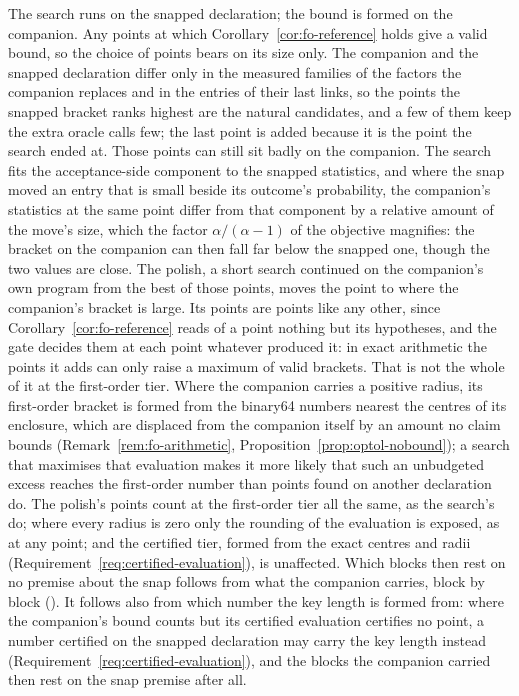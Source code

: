 The search runs on the snapped declaration; the bound is formed on the
companion. Any points at which Corollary~\ref{cor:fo-reference} holds give a
valid bound, so the choice of points bears on its size only. The companion
and the snapped declaration differ only in the measured families of the
factors the companion replaces and in the entries of their last links, so the
points the snapped bracket ranks highest are the natural candidates, and a
few of them keep the extra oracle calls few; the last point is added because
it is the point the search ended at. Those points can still sit badly on the
companion. The search fits the acceptance-side component to the snapped
statistics, and where the snap moved an entry that is small beside its
outcome's probability, the companion's statistics at the same point differ
from that component by a relative amount of the move's size, which the
factor $\alpha/(\alpha-1)$ of the objective magnifies: the bracket on the
companion can then fall far below the snapped one, though the two values are
close. The polish, a short search continued on the companion's own program
from the best of those points, moves the point to where the companion's
bracket is large. Its points are points like any other, since
Corollary~\ref{cor:fo-reference} reads of a point nothing but its
hypotheses, and the gate decides them at each point whatever produced it:
in exact arithmetic the points it adds can only raise a maximum of valid
brackets. That is not the whole of it at the first-order tier. Where the
companion carries a positive radius, its first-order bracket is formed from
the binary64 numbers nearest the centres of its enclosure, which are
displaced from the companion itself by an amount no claim bounds
(Remark~\ref{rem:fo-arithmetic}, Proposition~\ref{prop:optol-nobound}); a
search that maximises that evaluation makes it more likely that such an
unbudgeted excess reaches the first-order number than points found on
another declaration do. The polish's points count at the first-order tier
all the same, as the search's do; where every radius is zero only the
rounding of the evaluation is exposed, as at any point; and the certified
tier, formed from the exact centres and radii
(Requirement~\ref{req:certified-evaluation}), is unaffected. Which blocks then rest
on no premise about the snap follows from what the companion carries, block
by block (). It follows also from
which number the key length is formed from: where the companion's bound
counts but its certified evaluation certifies no point, a number certified
on the snapped declaration may carry the key length instead
(Requirement~\ref{req:certified-evaluation}), and the blocks the companion
carried then rest on the snap premise after all.

